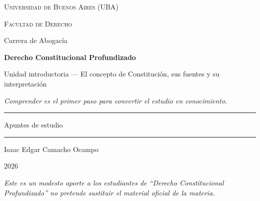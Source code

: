 \documentclass[12pt,oneside]{book}
\newcommand{\universidad}{Universidad de Buenos Aires (UBA)}
\newcommand{\facultad}{Facultad de Derecho}
\newcommand{\carrera}{Carrera de Abogacía}
\newcommand{\materia}{Derecho Constitucional Profundizado}
\newcommand{\titulo}{Unidad introductoria --- El concepto de Constitución, sus fuentes y su interpretación}
\newcommand{\autor}{Isaac Edgar Camacho Ocampo}
\newcommand{\anio}{2026}
\begin{document}
\begin{titlepage}

\thispagestyle{empty}

\begin{center}

\vspace*{1cm}

{\large \textsc{\universidad}}

\vspace{0.2cm}

{\large \textsc{\facultad}}

\vspace{0.2cm}

{\large \carrera}

\vspace{3cm}

{\Huge \textbf{\materia}}

\vspace{1cm}

{\LARGE \titulo}

\vspace{0.8cm}

\textit{Comprender es el primer paso para convertir el estudio en conocimiento.}

\vspace{1.2cm}

\rule{0.70\textwidth}{0.5pt}

\vspace{0.5cm}

{\large Apuntes de estudio}

\vspace{0.5cm}

\rule{0.70\textwidth}{0.5pt}

\vfill

{\large \autor}

\vspace{0.3cm}

{\large \anio}

\end{center}

\vfill

\begin{flushleft}
\textit{Este es un modesto aporte a los estudiantes de ``Derecho Constitucional Profundizado'' no pretende sustituir el material oficial de la materia.}
\end{flushleft}

\end{titlepage}
\end{document}
